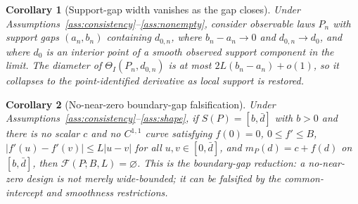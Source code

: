 \documentclass[11pt]{article}
\theoremstyle{definition}
\theoremstyle{plain}
\newtheorem{corollary}{Corollary}
\theoremstyle{remark}
\begin{document}
\begin{corollary}[Support-gap width vanishes as the gap closes]\label{cor:gap-closes}
Under Assumptions~\ref{ass:consistency}--\ref{ass:nonempty}, consider observable laws \(P_n\) with support gaps \((a_n,b_n)\) containing \(d_{0,n}\), where \(b_n-a_n\to0\) and \(d_{0,n}\to d_0\), and where \(d_0\) is an interior point of a smooth observed support component in the limit.  The diameter of \(\Theta_I(P_n,d_{0,n})\) is at most \(2L(b_n-a_n)+o(1)\), so it collapses to the point-identified derivative as local support is restored.
\end{corollary}

\begin{corollary}[No-near-zero boundary-gap falsification]\label{cor:boundary-falsification}
Under Assumptions~\ref{ass:consistency}--\ref{ass:shape}, if \(S(P)=[b,\bar d]\) with \(b>0\) and there is no scalar \(c\) and no \(C^{1,1}\) curve satisfying \(f(0)=0\), \(0\le f'\le B\), \(|f'(u)-f'(v)|\le L|u-v|\) for all \(u,v\in[0,\bar d]\), and \(m_P(d)=c+f(d)\) on \([b,\bar d]\), then \(\mathcal{F}(P;B,L)=\varnothing\).  This is the boundary-gap reduction: a no-near-zero design is not merely wide-bounded; it can be falsified by the common-intercept and smoothness restrictions.
\end{corollary}
\end{document}
